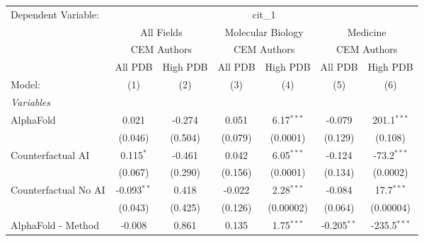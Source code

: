 \begingroup
\centering
\begin{tabular}{lcccccc}
   \tabularnewline \midrule \midrule
   Dependent Variable: & \multicolumn{6}{c}{cit\_1}\\
 & \multicolumn{2}{c}{All Fields} & \multicolumn{2}{c}{Molecular Biology} & \multicolumn{2}{c}{Medicine} \\
\cmidrule(lr){2-3} \cmidrule(lr){4-5} \cmidrule(lr){6-7}
 & \multicolumn{2}{c}{CEM Authors} & \multicolumn{2}{c}{CEM Authors} & \multicolumn{2}{c}{CEM Authors} \\
\cmidrule(lr){2-3} \cmidrule(lr){4-5} \cmidrule(lr){6-7}
 & \multicolumn{1}{c}{All PDB} & \multicolumn{1}{c}{High PDB} & \multicolumn{1}{c}{All PDB} & \multicolumn{1}{c}{High PDB} & \multicolumn{1}{c}{All PDB} & \multicolumn{1}{c}{High PDB} \\
\cmidrule(lr){2-2} \cmidrule(lr){3-3} \cmidrule(lr){4-4} \cmidrule(lr){5-5} \cmidrule(lr){6-6} \cmidrule(lr){7-7}
   Model:                                                     & (1)           & (2)         & (3)           & (4)           & (5)           & (6)\\  
   \midrule
   \emph{Variables}\\
   AlphaFold                                                  & 0.021         & -0.274      & 0.051         & 6.17$^{***}$  & -0.079        & 201.1$^{***}$\\   
                                                              & (0.046)       & (0.504)     & (0.079)       & (0.0001)      & (0.129)       & (0.108)\\   
   Counterfactual AI                                          & 0.115$^{*}$   & -0.461      & 0.042         & 6.05$^{***}$  & -0.124        & -73.2$^{***}$\\   
                                                              & (0.067)       & (0.290)     & (0.156)       & (0.0001)      & (0.134)       & (0.0002)\\   
   Counterfactual No AI                                       & -0.093$^{**}$ & 0.418       & -0.022        & 2.28$^{***}$  & -0.084        & 17.7$^{***}$\\   
                                                              & (0.043)       & (0.425)     & (0.126)       & (0.00002)     & (0.064)       & (0.00004)\\   
   AlphaFold - Method                                         & -0.008        & 0.861       & 0.135         & 1.75$^{***}$  & -0.205$^{**}$ & -235.5$^{***}$\\   

\end{tabular}
